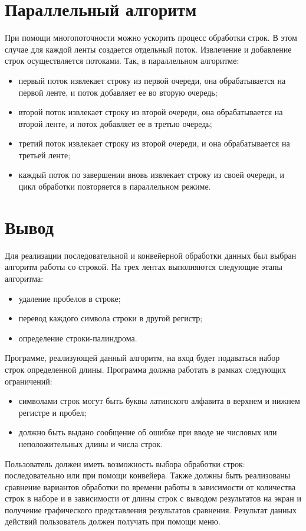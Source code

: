 \section{Параллельный алгоритм}

При помощи многопоточности можно ускорить процесс обработки строк. В этом случае для каждой ленты создается отдельный поток. Извлечение и добавление строк осуществляется потоками. Так, в параллельном алгоритме:

\begin{itemize}
	\item первый поток извлекает строку из первой очереди, она обрабатывается на первой ленте, и поток добавляет ее во вторую очередь;
	\item второй поток извлекает строку из второй очереди, она обрабатывается на второй ленте, и поток добавляет ее в третью очередь;
	\item третий поток извлекает строку из второй очереди, и она обрабатывается на третьей ленте;
	\item каждый поток по завершении вновь извлекает строку из своей очереди, и цикл обработки повторяется в параллельном режиме.
\end{itemize}

\section{Вывод}

Для реализации последовательной и конвейерной обработки данных был выбран алгоритм работы со строкой. На трех лентах выполняются следующие этапы алгоритма:

\begin{itemize}
	\item удаление пробелов в строке;
	\item перевод каждого символа строки в другой регистр;
	\item определение строки-палиндрома.
\end{itemize}

Программе, реализующей данный алгоритм, на вход будет подаваться набор строк определенной длины. Программа должна работать в рамках следующих ограничений:

\begin{itemize}
	\item символами строк могут быть буквы латинского алфавита в верхнем и нижнем регистре и пробел;
	\item должно быть выдано сообщение об ошибке при вводе не числовых или неположительных длины и числа строк.
\end{itemize}

Пользователь должен иметь возможность выбора обработки строк: последовательно или при помощи конвейера. Также должны быть реализованы сравнение вариантов обработки по времени работы в зависимости от количества строк в наборе и в зависимости от длины строк с выводом результатов на экран и получение графического представления результатов сравнения. Результат данных действий пользователь должен получать при помощи меню.